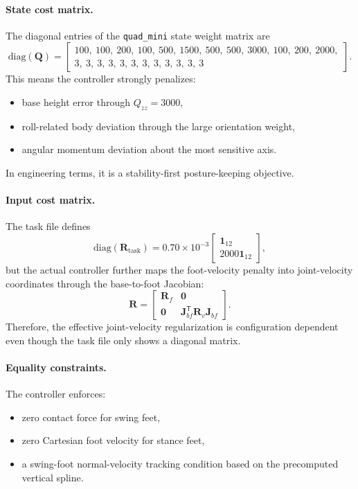 \documentclass[11pt,a4paper]{article}
\newcommand{\mat}[1]{\mathbf{#1}}
\newcommand{\trans}{^{\mathsf T}}
\newcommand{\code}[1]{\texttt{#1}}
\begin{document}
\paragraph{State cost matrix.}
The diagonal entries of the \code{quad\_mini} state weight matrix are
\begin{equation}
\mathrm{diag}(\mat{Q}) =
\begin{bmatrix}
100,\ 100,\ 200,\ 100,\ 500,\ 1500,\ 500,\ 500,\ 3000,\ 100,\ 200,\ 2000, \nonumber \\
3,\ 3,\ 3,\ 3,\ 3,\ 3,\ 3,\ 3,\ 3,\ 3,\ 3,\ 3
\end{bmatrix}.
\end{equation}
This means the controller strongly penalizes:
\begin{itemize}[leftmargin=*]
  \item base height error through $Q_{zz}=3000$,
  \item roll-related body deviation through the large orientation weight,
  \item angular momentum deviation about the most sensitive axis.
\end{itemize}
In engineering terms, it is a stability-first posture-keeping objective.

\paragraph{Input cost matrix.}
The task file defines
\begin{equation}
\mathrm{diag}(\mat{R}_{\mathrm{task}}) =
0.70\times 10^{-3}
\begin{bmatrix}
\mathbf{1}_{12} \\
2000\mathbf{1}_{12}
\end{bmatrix},
\end{equation}
but the actual controller further maps the foot-velocity penalty into joint-velocity coordinates through the base-to-foot Jacobian:
\begin{equation}
\mat{R} =
\begin{bmatrix}
\mat{R}_f & \mat{0} \\
\mat{0} & \mat{J}_{bf}\trans \mat{R}_v \mat{J}_{bf}
\end{bmatrix}.
\end{equation}
Therefore, the effective joint-velocity regularization is configuration dependent even though the task file only shows a diagonal matrix.

\paragraph{Equality constraints.}
The controller enforces:
\begin{itemize}[leftmargin=*]
  \item zero contact force for swing feet,
  \item zero Cartesian foot velocity for stance feet,
  \item a swing-foot normal-velocity tracking condition based on the precomputed vertical spline.
\end{itemize}
\end{document}
